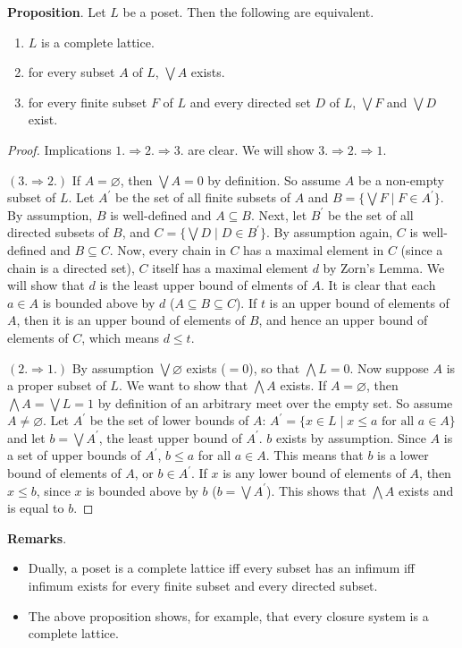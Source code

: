 \documentclass[12pt]{article}
\begin{document}
\textbf{Proposition}.  Let $L$ be a poset.  Then the following are equivalent.

\begin{enumerate}
\item $L$ is a complete lattice.
\item for every subset $A$ of $L$, $\bigvee A$ exists.
\item for every finite subset $F$ of $L$ and every directed set $D$ of $L$, $\bigvee F$ and $\bigvee D$ exist.
\end{enumerate}

\begin{proof} Implications $1.\Rightarrow 2.\Rightarrow 3.$ are clear.  We will show $3.\Rightarrow 2.\Rightarrow 1.$

$(3.\Rightarrow 2.)$  If $A=\varnothing$, then $\bigvee A=0$ by definition.  So assume $A$ be a non-empty subset of $L$.  Let $A^{\prime}$ be the set of all finite subsets of $A$ and $B=\lbrace \bigvee F\mid F\in A^{\prime}\rbrace$.  By assumption, $B$ is well-defined and $A\subseteq B$.  Next, let $B^{\prime}$ be the set of all directed subsets of $B$, and $C=\lbrace \bigvee D\mid D\in B^{\prime}\rbrace$.  By assumption again, $C$ is well-defined and $B\subseteq C$.  Now, every chain in $C$ has a maximal element in $C$ (since a chain is a directed set), $C$ itself has a maximal element $d$ by Zorn's Lemma.  We will show that $d$ is the least upper bound of elments of $A$.  It is clear that each $a\in A$ is bounded above by $d$ ($A\subseteq B\subseteq C$).  If $t$ is an upper bound of elements of $A$, then it is an upper bound of elements of $B$, and hence an upper bound of elements of $C$, which means $d\le t$.

$(2.\Rightarrow 1.)$  By assumption $\bigvee \varnothing$ exists ($=0$), so that $\bigwedge L=0$.  Now suppose $A$ is a proper subset of $L$.  We want to show that $\bigwedge A$ exists.  If $A=\varnothing$, then $\bigwedge A=\bigvee L=1$ by definition of an arbitrary meet over the empty set.  So assume $A\neq \varnothing$.  Let $A^{\prime}$ be the set of lower bounds of $A$: $A^{\prime}=\lbrace x\in L\mid x\le a\mbox{ for all }a\in A\rbrace$ and let $b=\bigvee A^{\prime}$, the least upper bound of $A^{\prime}$.  $b$ exists by assumption.  Since $A$ is a set of upper bounds of $A^{\prime}$, $b\le a$ for all $a\in A$.  This means that $b$ is a lower bound of elements of $A$, or $b\in A^{\prime}$.  If $x$ is any lower bound of elements of $A$, then $x\le b$, since $x$ is bounded above by $b$ ($b=\bigvee A^{\prime}$).  This shows that $\bigwedge A$ exists and is equal to $b$.
\end{proof}

\textbf{Remarks}.  
\begin{itemize}
\item
Dually, a poset is a complete lattice iff every subset has an infimum iff infimum exists for every finite subset and every directed subset.
\item
The above proposition shows, for example, that every closure system is a complete lattice.
\end{itemize}
\end{document}
